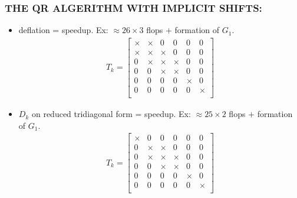 \documentclass[a4paper,8pt]{beamer} %
\newcommand{\smatrix}[1]{\left[\begin{matrix} #1 \end{matrix}\right]}
\begin{document}
\begin{frame} \frametitle{THE QR ALGERITHM WITH IMPLICIT SHIFTS:} %
\begin{itemize}
	\item deflation = speedup. Ex: $\approx 26 \times 3$ flops $+$ formation of $G_1$.
		\begin{align}
			T_k = \smatrix{
				\times & \times & 		0 	& 0 & 0 & 0 \\
				\times & \times & \times 	& 0 & 0 & 0 \\
				0 & \times & \times	& \times 	& 0 & 0 \\
				0 &  0 & \times	& \times 		& 0 & 0 \\
				0 &  0 & 0	& 0 	& \times & 0 \\
				0 &  0 & 0	& 0 	& 0 & \times \\
			}
		\end{align}
	\item $D_k$ on reduced tridiagonal form = speedup. Ex: $\approx 25\times2$ flops $+$ formation of $G_1$.
		\begin{align}
			T_k = \smatrix{
				\times & 0 & 		0 	& 0 & 0 & 0 \\
				0 & \times & \times 	& 0 & 0 & 0 \\
				0 & \times & \times	& \times 	& 0 & 0 \\
				0 &  0 & \times	& \times 		& 0 & 0 \\
				0 &  0 & 0	& 0 	& \times & 0 \\
				0 &  0 & 0	& 0 	& 0 & \times \\
			}
		\end{align}
\end{itemize}
\end{frame}%
\end{document}
